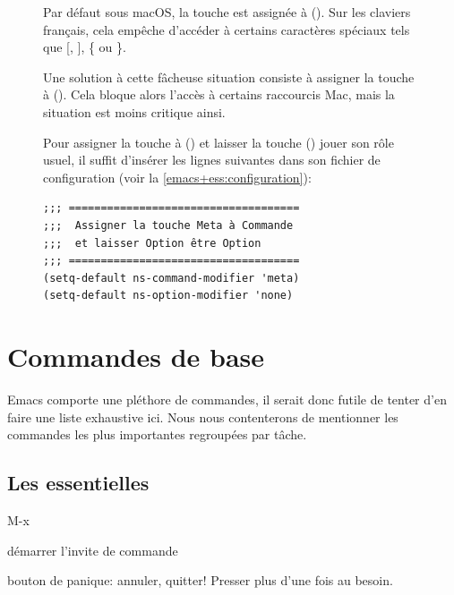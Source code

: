 \begin{figure}[t]
  \begin{osx}
    Par défaut sous macOS, la touche  est assignée à
     (\optkey). Sur les claviers français, cela empêche
    d'accéder à certains caractères spéciaux tels que [, ], \{ ou \}.

    Une solution à cette fâcheuse situation consiste à assigner
    la touche  à  (\cmdkey). Cela bloque
    alors l'accès à certains raccourcis Mac, mais la situation est
    moins critique ainsi.

    Pour assigner la touche  à  (\cmdkey) et
    laisser la touche  (\optkey) jouer son rôle usuel, il
    suffit d'insérer les lignes suivantes dans son fichier de
    configuration  (voir la
    \autoref{emacs+ess:configuration}):
\begin{verbatim}
;;; ====================================
;;;  Assigner la touche Meta à Commande
;;;  et laisser Option être Option
;;; ====================================
(setq-default ns-command-modifier 'meta)
(setq-default ns-option-modifier 'none)
\end{verbatim}
  \end{osx}
  \label{fig:ess:meta}
\end{figure}



\section{Commandes de base}
\label{emacs+ess:commandes}

Emacs comporte une pléthore de commandes, il serait donc futile de
tenter d'en faire une liste exhaustive ici. Nous nous contenterons de
mentionner les commandes les plus importantes regroupées par tâche.


\subsection{Les essentielles}
\label{emacs+ess:commandes:essentielles}

\begin{ttscript}{M-x}
\item[\code{M-x}] démarrer l'invite de commande
\item[\code{C-g}] bouton de panique: annuler, quitter! Presser plus
  d'une fois au besoin.
\end{ttscript}

